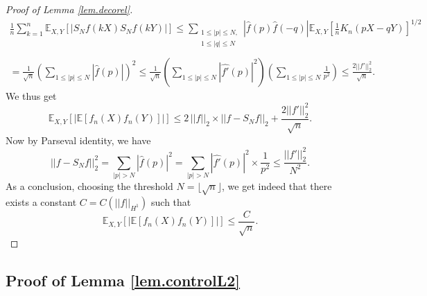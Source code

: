 \documentclass{svproc}
\begin{document}
\begin{proof}[Proof of Lemma \ref{lem.decorel}]
\[
\begin{array}{l}
\displaystyle{\frac{1}{n}\sum_{k=1}^{n} \mathbb E_{X,Y}\left[|S_N f(kX) S_N f(kY)|\right]}  \displaystyle{\leq \sum_{\substack{1\leq |p|\leq N, \\ 1\leq |q|\leq N}}|\widehat{f}(p)\widehat{f}(-q)|\mathbb E_{X,Y}\left[\frac{1}{n}K_n(pX-qY)\right]^{1/2}}\\
\\
 =\displaystyle{ \frac{1}{\sqrt{n}} \left( \sum_{1\leq |p|\leq N}|\widehat{f}(p)|\right)^2 \leq \frac{1}{\sqrt{n}} \left( \sum_{1\leq |p|\leq N}|\widehat{f'}(p)|^2\right)\left( \sum_{1\leq |p|\leq N}\frac{1}{p^2}\right)\leq \frac{2 ||f'||_2^2}{\sqrt{n}}}.
\end{array}
\]
We thus get 
\[
\mathbb E_{X,Y} \left[ \left|\mathbb E[f_n(X)f_n(Y)] \right|\right] \leq 2\, ||f||_2 \times ||f-S_Nf ||_2 + \frac{2 ||f'||_2^2}{\sqrt{n}}.
\]
Now by Parseval identity, we have 
\[
||f-S_Nf ||_2^2 = \sum_{|p|>N}|\widehat{f}(p)|^2 =  \sum_{|p|>N}|\widehat{f'}(p)|^2 \times \frac{1}{p^2} \leq \frac{||f'||_2^2}{N^2}.
\]
As a conclusion, choosing the threshold $N=\lfloor\sqrt{n}\rfloor$, we get indeed that there exists a constant $C=C(||f||_{H^1})$ such that 
\[
\mathbb E_{X,Y} \left[ \left|\mathbb E[f_n(X)f_n(Y)] \right|\right]\leq \frac{C}{\sqrt{n}}.
\]
\end{proof}



\subsection{Proof of Lemma \ref{lem.controlL2}}\label{sec.appcontrolL2}
\end{document}

